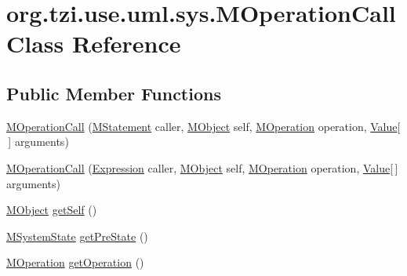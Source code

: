 \hypertarget{classorg_1_1tzi_1_1use_1_1uml_1_1sys_1_1_m_operation_call}{\section{org.\-tzi.\-use.\-uml.\-sys.\-M\-Operation\-Call Class Reference}
\label{classorg_1_1tzi_1_1use_1_1uml_1_1sys_1_1_m_operation_call}
}
\subsection*{Public Member Functions}
\begin{DoxyCompactItemize}
\item 
\hyperlink{classorg_1_1tzi_1_1use_1_1uml_1_1sys_1_1_m_operation_call_a4e26470952e7675614fe6dc459fdb234}{M\-Operation\-Call} (\hyperlink{classorg_1_1tzi_1_1use_1_1uml_1_1sys_1_1soil_1_1_m_statement}{M\-Statement} caller, \hyperlink{interfaceorg_1_1tzi_1_1use_1_1uml_1_1sys_1_1_m_object}{M\-Object} self, \hyperlink{classorg_1_1tzi_1_1use_1_1uml_1_1mm_1_1_m_operation}{M\-Operation} operation, \hyperlink{classorg_1_1tzi_1_1use_1_1uml_1_1ocl_1_1value_1_1_value}{Value}\mbox{[}$\,$\mbox{]} arguments)
\item 
\hyperlink{classorg_1_1tzi_1_1use_1_1uml_1_1sys_1_1_m_operation_call_ac2ee0c10b2ab437ccb8c2617092354b2}{M\-Operation\-Call} (\hyperlink{classorg_1_1tzi_1_1use_1_1uml_1_1ocl_1_1expr_1_1_expression}{Expression} caller, \hyperlink{interfaceorg_1_1tzi_1_1use_1_1uml_1_1sys_1_1_m_object}{M\-Object} self, \hyperlink{classorg_1_1tzi_1_1use_1_1uml_1_1mm_1_1_m_operation}{M\-Operation} operation, \hyperlink{classorg_1_1tzi_1_1use_1_1uml_1_1ocl_1_1value_1_1_value}{Value}\mbox{[}$\,$\mbox{]} arguments)
\item 
\hyperlink{interfaceorg_1_1tzi_1_1use_1_1uml_1_1sys_1_1_m_object}{M\-Object} \hyperlink{classorg_1_1tzi_1_1use_1_1uml_1_1sys_1_1_m_operation_call_a9d89c61eed27e1108a59a323f4207fc7}{get\-Self} ()
\item 
\hyperlink{classorg_1_1tzi_1_1use_1_1uml_1_1sys_1_1_m_system_state}{M\-System\-State} \hyperlink{classorg_1_1tzi_1_1use_1_1uml_1_1sys_1_1_m_operation_call_af16eece2c3f5fa9569bfc119bc6c816e}{get\-Pre\-State} ()
\item 
\hyperlink{classorg_1_1tzi_1_1use_1_1uml_1_1mm_1_1_m_operation}{M\-Operation} \hyperlink{classorg_1_1tzi_1_1use_1_1uml_1_1sys_1_1_m_operation_call_aa380bd5bdc9d0691cf7c69f159969b10}{get\-Operation} ()
\item 

\end{DoxyCompactItemize}

